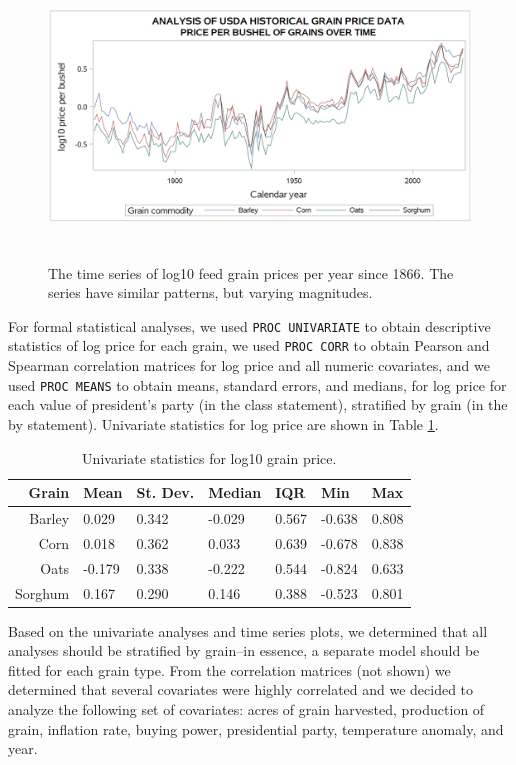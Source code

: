 \documentclass[11pt]{article}
\begin{document}
\begin{figure}[!ht]
	\centering
	\includegraphics[height=3in]{../figs/timeseries.png}
	\caption{The time series of log10 feed grain prices per year since 1866.
	The series have similar patterns, but varying magnitudes.}
	\label{fig:timeseries}
\end{figure}

For formal statistical analyses, we used \texttt{PROC UNIVARIATE} to obtain
descriptive statistics of log price for each grain, we used \texttt{PROC CORR}
to obtain Pearson and Spearman correlation matrices for log price and all
numeric covariates, and we used \texttt{PROC MEANS} to obtain means, standard
errors, and medians, for log price for each value of president's party (in the
class statement), stratified by grain (in the by statement). Univariate
statistics for log price are shown in Table \ref{tab:univar}.

\begin{table}
	\centering
	\begin{tabular}{rllllll}
		\toprule
		Grain & Mean & St. Dev. & Median & IQR & Min & Max \\
		\midrule
		Barley & 0.029 & 0.342 & -0.029 & 0.567 & -0.638 & 0.808 \\
		Corn & 0.018 & 0.362 & 0.033 & 0.639 & -0.678 & 0.838 \\
		Oats & -0.179 & 0.338 & -0.222 & 0.544 & -0.824 & 0.633 \\
		Sorghum & 0.167 & 0.290 & 0.146 & 0.388 & -0.523 & 0.801 \\
		\bottomrule
	\end{tabular}
	\caption{Univariate statistics for log10 grain price.}
	\label{tab:univar}
\end{table}

Based on the univariate analyses and time series plots, we determined that all
analyses should be stratified by grain--in essence, a separate model should be
fitted for each grain type. From the correlation matrices (not shown) we
determined that several covariates were highly correlated and we decided to
analyze the following set of covariates: acres of grain harvested, production
of grain, inflation rate, buying power, presidential party, temperature
anomaly, and year.
\end{document}
